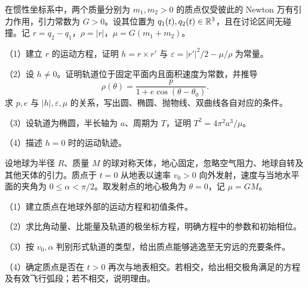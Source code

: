 \noindent\begin{minipage}{\linewidth}
在惯性坐标系中，两个质量分别为 $m_1,m_2>0$ 的质点仅受彼此的 Newton 万有引力作用，引力常数为 $G>0$。设其位置为 $q_1(t),q_2(t)\in\mathbb R^3$，且在讨论区间无碰撞。记 $r=q_2-q_1$，$\rho=|r|$，$\mu=G(m_1+m_2)$。
\par（1）建立 $r$ 的运动方程，证明 $h=r\times r'$ 与 $\varepsilon=|r'|^2/2-\mu/\rho$ 为常量。
\par（2）设 $h\ne0$。证明轨道位于固定平面内且面积速度为常数，并推导
\[\rho(\theta)=\frac{p}{1+e\cos(\theta-\theta_0)}.\]
求 $p,e$ 与 $|h|,\varepsilon,\mu$ 的关系，写出圆、椭圆、抛物线、双曲线各自对应的条件。
\par（3）设轨道为椭圆，半长轴为 $a$、周期为 $T$，证明 $T^2=4\pi^2a^3/\mu$。
\par（4）描述 $h=0$ 时的运动轨迹。
\end{minipage}\par\vspace{5pt}
\noindent\begin{minipage}{\linewidth}
设地球为半径 $R$、质量 $M$ 的球对称天体，地心固定，忽略空气阻力、地球自转及其他天体的引力。质点于 $t=0$ 从地表以速率 $v_0>0$ 向外发射，速度与当地水平面的夹角为 $0\le\alpha<\pi/2$。取发射点的地心极角为 $\theta=0$，记 $\mu=GM$。
\par（1）建立质点在地球外部的运动方程和初值条件。
\par（2）求比角动量、比能量及轨道的极坐标方程，明确方程中的参数和初始相位。
\par（3）按 $v_0,\alpha$ 判别形式轨道的类型，给出质点能够逃逸至无穷远的充要条件。
\par（4）确定质点是否在 $t>0$ 再次与地表相交。若相交，给出相交极角满足的方程及有效飞行弧段；若不相交，说明理由。
\end{minipage}\par\vspace{5pt}
